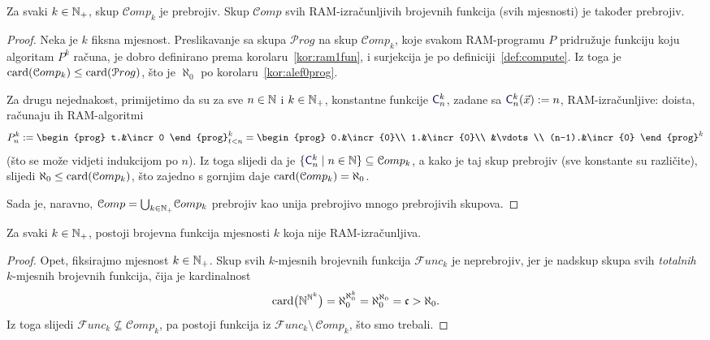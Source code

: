 \begin{teorem}[{name=[prebrojivost skupa $\mathcal Comp$]}]\label{tm:alef0izr}
Za svaki $k\in{\mathbb N}_+$, skup $\mathcal Comp_k$ je prebrojiv. Skup $\mathcal Comp$ svih RAM-izračunljivih brojevnih funkcija (svih mjesnosti) je također prebrojiv.
\end{teorem}
\begin{proof}
Neka je $k$ fiksna mjesnost. Preslikavanje
sa skupa $\mathcal Prog$ na skup $\mathcal Comp_k$,
    koje svakom RAM-programu $P$ pridružuje funkciju koju algoritam $P^k$ računa, je dobro definirano prema korolaru~\ref{kor:ram1fun}, i surjekcija je po definiciji~\ref{def:compute}. Iz toga je $\operatorname{card}(\mathcal Comp_k)\le\operatorname{card}(\mathcal Prog)$, što je $\aleph_0$ po korolaru~\ref{kor:alef0prog}.

Za drugu nejednakost, primijetimo da su za sve $n\in{\mathbb N}$ i $k\in{\mathbb N}_+$, konstantne funkcije $\f{C}_n^k$, zadane sa
$\f{C}_n^k(\vec x):=n$, RAM-izračunljive: doista, računaju ih RAM-algoritmi
\begin{equation}\label{eq:konstRAM}
    P_n^k:=\begin{prog}
    t.&\incr0
    \end{prog}_{t<n}^k=\begin{prog}
    0.&\incr{0}\\
    1.&\incr{0}\\
    &\vdots\\
    (n-1).&\incr{0}
    \end{prog}^k
\end{equation}
(što se može vidjeti indukcijom po $n$).
Iz toga slijedi da je $\{\f{C}_n^k\mid n\in\N\}\subseteq\mathcal Comp_k$, a kako je taj skup prebrojiv (sve konstante su različite), slijedi $\aleph_0\le\operatorname{card}(\mathcal Comp_k)$, što zajedno s gornjim daje $\operatorname{card}(\mathcal Comp_k)=\aleph_0$.

Sada je, naravno, $\mathcal Comp=\bigcup_{k\in{\mathbb N}_+}\!\mathcal Comp_k$ prebrojiv kao unija prebrojivo mnogo prebrojivih skupova.
\end{proof}

\begin{korolar}[{name=[postojanje ne-RAM-izračunljivih funkcija]}]\label{kor:exneizrk}
Za svaki $k\in{\mathbb N}_+$, postoji brojevna funkcija mjesnosti $k$ koja nije RAM-izračunljiva.
\end{korolar}
\begin{proof}
Opet, fiksirajmo mjesnost $k\in{\mathbb N}_+$. Skup svih $k$-mjesnih brojevnih funkcija $\mathcal Func_k$ je neprebrojiv, jer je nadskup skupa svih \emph{totalnih} $k$-mjesnih brojevnih funkcija, čija je kardinalnost
\begin{equation}
    \operatorname{card}\bigl({\mathbb N}^{{\mathbb N}^k}\bigr)=\aleph_0^{\aleph_0^k}=\aleph_0^{\aleph_0}=\mathfrak c>\aleph_0\text.
\end{equation}
Iz toga slijedi $\mathcal Func_k\not\subseteq\mathcal Comp_k$, pa postoji funkcija iz $\mathcal Func_k\setminus\,\mathcal Comp_k$, što smo trebali.
\end{proof}

